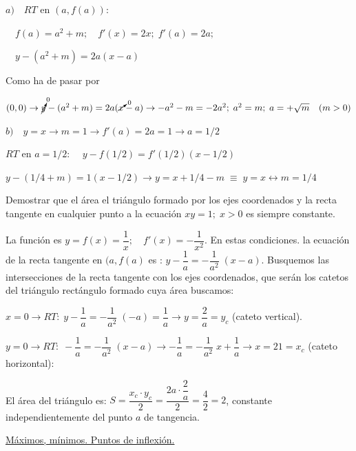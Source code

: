 	\begin{proofw}\renewcommand{\qedsymbol}{$\diamond$}
		
	

		\hspace{5mm}$a) \quad RT$ en $(a,f(a))$: 
		
		$\quad f(a)=a^2+m; \quad f'(x)=2x; \; f'(a)=2a; $
		
		$\quad y-(a^2+m)=2a(x-a)$ 
		
		Como ha de pasar por 
		
		$(0,0) \to \cancelto{0}{y}-(a^2+m)=2a(\cancelto{0}{x}-a) \to -a^2-m=-2a^2; \; a^2=m;\; a=+\sqrt{m} \quad (m>0)$
		
		\vspace{4mm}
		
		$b) \quad y=x \to m=1 \to f'(a)=2a=1 \to a=1/2$
		
		$RT$ en $a=1/2$: $\quad y-f(1/2)=f'(1/2)(x-1/2)$
		
		$y-(1/4+m)=1(x-1/2) \to y=x+1/4-m\; \equiv  \;  y=x \leftrightarrow m=1/4$
	\end{proofw}

	\begin{ejre}
		Demostrar que el área el triángulo formado por los ejes coordenados y la recta tangente en cualquier punto a la ecuación $xy=1; \; x>0$ es siempre constante.
	\end{ejre}
	
	\begin{proofw}\renewcommand{\qedsymbol}{$\diamond$}
	
	La función es $y=f(x)=\dfrac 1 x; \quad f'(x)=-\dfrac 1  {x^2}$. En estas condiciones. la ecuación de la recta tangente en $(a,f(a)$ es : $y-\dfrac 1 a =- \dfrac 1 {a^2}\; (x-a)$. Busquemos las intersecciones de la recta tangente con los ejes coordenados, que serán los catetos del triángulo rectángulo formado cuya área buscamos:
	
	$x=0 \to RT:\; y-\dfrac 1 a = -\dfrac 1 {a^2}\; (-a)=\dfrac 1 a \to y=\dfrac 2 a=y_c$ (cateto vertical).
	
	$y=0 \to RT:\; -\dfrac 1 a =-\dfrac 1 {a^2}\; (x-a) \to -\dfrac 1 a =-\dfrac 1 {a^2}\; x + \dfrac 1 a \to x=21=x_c$ (cateto horizontal):
	
	El área del triángulo es: $S=\dfrac {x_c\cdot y_c}{2}=\dfrac {2a \cdot \dfrac 2 a}{2}=\dfrac 4 2 = 2 $, constante independientemente del punto $a$ de tangencia.	
	\end{proofw}

	
	\underline{Máximos, mínimos. Puntos de inflexión.}
	
